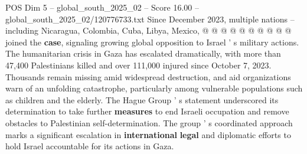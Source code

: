 \begin{textsample}{POS Dim 5 – global\_south\_2025\_02 – Score 16.00 – global\_south\_2025\_02/120776733.txt}
Since December 2023, multiple nations -- including Nicaragua, Colombia, Cuba, Libya, Mexico, @ @ @ @ @ @ @ @ @ @ joined the \textbf{case}, signaling growing global opposition to Israel ' s military actions.
The humanitarian crisis in Gaza has escalated dramatically, with more than 47,400 Palestinians killed and over 111,000 injured since October 7, 2023.
Thousands remain missing amid widespread destruction, and aid organizations warn of an unfolding catastrophe, particularly among vulnerable populations such as children and the elderly.
The Hague Group ' s statement underscored its determination to take further \textbf{measures} to end Israeli occupation and remove obstacles to Palestinian self-determination.
The group ' s coordinated approach marks a significant escalation in \textbf{international} \textbf{legal} and diplomatic efforts to hold Israel accountable for its actions in Gaza.

\end{textsample}
